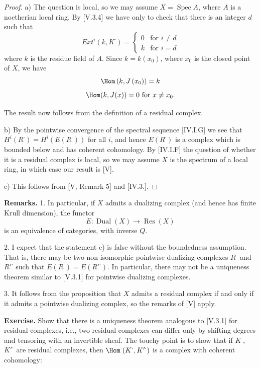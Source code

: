 \documentclass[12pt]{book}
\DeclareMathOperator{\Spec}{Spec}
\begin{document}
\begin{proof}
a) The question is local, so we may assume \(X=\Spec A\), where \(A\) is a noetherian local ring. By [V.3.4] we have only to check that there is an integer \(d\) such that
\[
Ext^{i}\left(k, K^{\cdot}\right)=
\begin{cases}
0 & \text{for } i \neq d \\
k & \text{for } i=d
\end{cases}
\]
where \(k\) is the residue field of \(A\). Since \(k=k(x_{0})\), where \(x_{0}\) is the closed point of \(X\), we have
\[
\Hom \left(k, J\left(x_{0}\right)\right)=k
\]
\[
\Hom (k, J(x))=0 \text{ for } x \neq x_{0}.
\]

\setcounter{page}{306}
The result now follows from the definition of a residual complex.

b) By the pointwise convergence of the spectral sequence [IV.I.G] we see that \(H^{i}(R^{\cdot})=H^{i}(E(R^{\cdot}))\) for all \(i\), and hence \(E(R^{\cdot})\) is a complex which is bounded below and has coherent cohomology. By [IV.I.F] the question of whether it is a residual complex is local, so we may assume \(X\) is the spectrum of a local ring, in which case our result is [V].

c) This follows from [V, Remark 5] and [IV.3.].
\end{proof}

\textbf{Remarks.}
1. In particular, if \(X\) admits a dualizing complex (and hence has finite Krull dimension), the functor
\[
E: \operatorname{Dual}(X) \to \operatorname{Res}(X)
\]
is an equivalence of categories, with inverse \(Q\).

2. I expect that the statement c) is false without the boundedness assumption. That is, there may be two non-isomorphic pointwise dualizing complexes \(R^{\cdot}\) and \(R'^{\cdot}\) such that \(E(R^{\cdot})=E(R'^{\cdot})\). In particular, there may not be a uniqueness theorem similar to [V.3.1] for pointwise dualizing complexes.

3. It follows from the proposition that \(X\) admits a residual complex if and only if it admits a pointwise dualizing complex, so the remarks of [V] apply.

\setcounter{page}{307}
\textbf{Exercise.} Show that there is a uniqueness theorem analogous to [V.3.1] for residual complexes, i.e., two residual complexes can differ only by shifting degrees and tensoring with an invertible sheaf. The touchy point is to show that if \(K^{\cdot}\), \(K'^{\cdot}\) are residual complexes, then \(\Hom^{\cdot}(K^{\cdot}, K'^{\cdot})\) is a complex with coherent cohomology:
\end{document}
